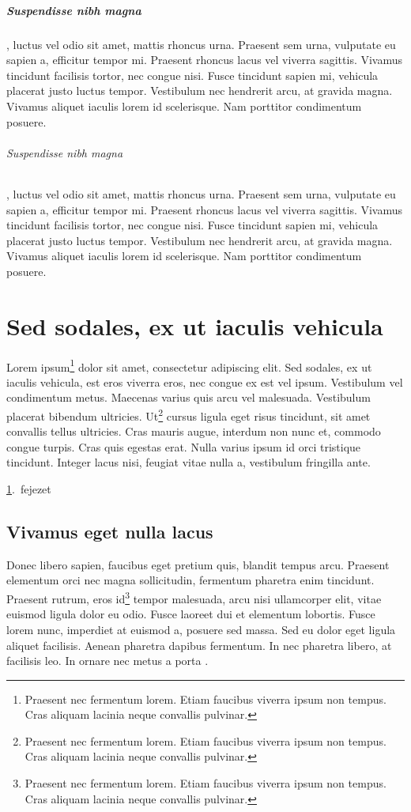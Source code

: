 \documentclass[a4paper,12pt,draft]{report}
\begin{document}
\paragraph{Suspendisse nibh magna}, luctus vel odio sit amet, mattis rhoncus urna. Praesent sem urna, vulputate eu sapien a, efficitur tempor mi. Praesent rhoncus lacus vel viverra sagittis. Vivamus tincidunt facilisis tortor, nec congue nisi. Fusce tincidunt sapien mi, vehicula placerat justo luctus tempor. Vestibulum nec hendrerit arcu, at gravida magna. Vivamus aliquet iaculis lorem id scelerisque. Nam porttitor condimentum posuere.

\subparagraph{Suspendisse nibh magna}, luctus vel odio sit amet, mattis rhoncus urna. Praesent sem urna, vulputate eu sapien a, efficitur tempor mi. Praesent rhoncus lacus vel viverra sagittis. Vivamus tincidunt facilisis tortor, nec congue nisi. Fusce tincidunt sapien mi, vehicula placerat justo luctus tempor. Vestibulum nec hendrerit arcu, at gravida magna. Vivamus aliquet iaculis lorem id scelerisque. Nam porttitor condimentum posuere.

\chapter{Sed sodales, ex ut iaculis vehicula}
\label{cha:sed}

Lorem ipsum\footnote{Praesent nec fermentum lorem. Etiam faucibus viverra ipsum non tempus. Cras aliquam lacinia neque convallis pulvinar.} dolor sit amet, consectetur adipiscing elit. Sed sodales, ex ut iaculis vehicula, est eros viverra eros, nec congue ex est vel ipsum. Vestibulum vel condimentum metus. Maecenas varius quis arcu vel malesuada. Vestibulum placerat bibendum ultricies. Ut\footnote{Praesent nec fermentum lorem. Etiam faucibus viverra ipsum non tempus. Cras aliquam lacinia neque convallis pulvinar.} cursus ligula eget risus tincidunt, sit amet convallis tellus ultricies. Cras mauris augue, interdum non nunc et, commodo congue turpis. Cras quis egestas erat. Nulla varius ipsum id orci tristique tincidunt. Integer lacus nisi, feugiat vitae nulla a, vestibulum fringilla ante. \citep{facsko_sw2024}

\ref{cha:sed}.~fejezet

\section{Vivamus eget nulla lacus}

Donec libero sapien, faucibus eget pretium quis, blandit tempus arcu. Praesent elementum orci nec magna sollicitudin, fermentum pharetra enim tincidunt. Praesent rutrum, eros id\footnote{Praesent nec fermentum lorem. Etiam faucibus viverra ipsum non tempus. Cras aliquam lacinia neque convallis pulvinar.} tempor malesuada, arcu nisi ullamcorper elit, vitae euismod ligula dolor eu odio.  Fusce laoreet dui et elementum lobortis. Fusce lorem nunc, imperdiet at euismod a, posuere sed massa. Sed eu dolor eget ligula aliquet facilisis. Aenean pharetra dapibus fermentum. In nec pharetra libero, at facilisis leo. In ornare nec metus a porta \citep[See][and references therein]{facsko2022_ssr}.
\end{document}
